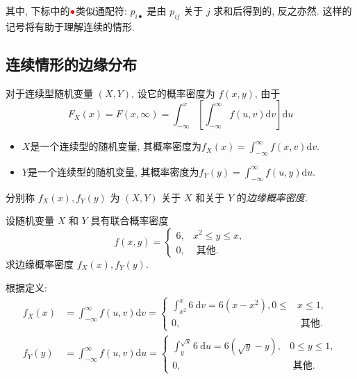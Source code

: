     其中, 下标中的${{\color{red}\bullet}}$类似通配符: $p_{i\bullet}$ 是由 $p_{i j}$ 关于 $j$ 求和后得到的, 反之亦然. 这样的记号将有助于理解连续的情形.

    \subsection{连续情形的边缘分布}

    \begin{definition*}
      对于连续型随机变量 $(X, Y)$, 设它的概率密度为 $f(x, y)$, 由于
        $$
            F_X(x)=F(x, \infty)=\int_{-\infty}^x\left[\int_{-\infty}^{\infty} f(u, v) \mathrm{d} v\right] \mathrm{d} u
        $$

        \begin{itemize}
            \item $X$是一个连续型的随机变量, 其概率密度为$f_X(x)=\int_{-\infty}^{\infty} f(x, v) \mathrm{d} v$.
            \item $Y$是一个连续型的随机变量, 其概率密度为$f_Y(y)=\int_{-\infty}^{\infty} f(u, y) \mathrm{d} u$.
        \end{itemize}

        分别称 $f_X(x), f_Y(y)$ 为 $(X, Y)$ 关于 $X$ 和关于 $Y$ 的\emph{边缘概率密度.}
    \end{definition*}

    \begin{example}
      设随机变量 $X$ 和 $Y$ 具有联合概率密度
            $$
                f(x, y)= \begin{cases}6, & x^2 \leqslant y \leqslant x, \\ 0, & \text { 其他. }\end{cases}
            $$
            求边缘概率密度 $f_X(x), f_Y(y)$.
    \end{example}

    \begin{solution}根据定义:
      $$\begin{aligned}
              f_X(x) & =\int_{-\infty}^{\infty} f(u, v) \mathrm{d} v= \begin{cases}\int_{x^2}^x 6 \mathrm{~d} v=6\left(x-x^2\right), 0 \leqslant & x \leqslant 1, \\
           0,                                                            & \text { 其他. }\end{cases}               \\
              f_Y(y) & =\int_{-\infty}^{\infty} f(u, v) \mathrm{d} u = \begin{cases}\int_y^{\sqrt{y}} 6 \mathrm{~d} u=6(\sqrt{y}-y), & 0 \leqslant y \leqslant 1, \\
           0,                                               & \text { 其他. }\end{cases}
          \end{aligned}
      $$
  \end{solution}

